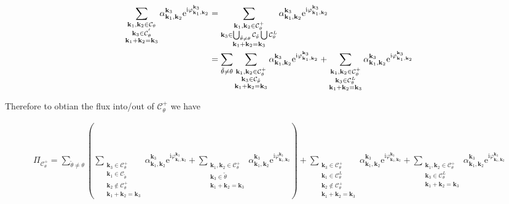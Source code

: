 \documentclass[9pt]{article}
\newcommand{\triad}[3]{\varphi_{#1, #2}^{#3}}                     %
\newcommand{\ii}{\mathrm{i}}      								  %
\newcommand{\e}{\mathrm{e}}      								  %
\newcommand{\alphakkk}[3]{\alpha_{\bfkn{#1}, \bfkn{#2}}^{\bfkn{#3}}}
\newcommand{\bfkn}[1]{\mathbf{k}_{#1}}								%
\begin{document}
\begin{align}
	\sum_{\substack{\bfkn{1}, \bfkn{2} \in \mathcal{C}_{\theta} \\ \bfkn{3} \in \mathcal{C}_{\theta}^{'} \\ \bfkn{1} + \bfkn{2} = \bfkn{3}}} \alphakkk{{1}}{2}{3}\e^{\ii \triad{\bfkn{1}}{\bfkn{2}}{\bfkn{3}}} &= \sum_{\substack{\bfkn{1}, \bfkn{2} \in \mathcal{C}_{\theta}^{+} \\ \bfkn{3} \in \bigcup_{\tilde{\theta} \neq \theta} \mathcal{C}_{\tilde{\theta}} \bigcup \mathcal{C}_{\theta}^{L} \\ \bfkn{1} + \bfkn{2} = \bfkn{3}}} \alphakkk{{1}}{2}{3}\e^{\ii \triad{\bfkn{1}}{\bfkn{2}}{\bfkn{3}}} \notag \\
	&= \sum_{\tilde{\theta} \neq \theta} \sum_{\substack{\bfkn{1}, \bfkn{2} \in \mathcal{C}_{\theta}^{+} \\ \bfkn{3} \in \mathcal{C}_{\tilde{\theta}} \\ \bfkn{1} + \bfkn{2} = \bfkn{3}}} \alphakkk{{1}}{2}{3}\e^{\ii \triad{\bfkn{1}}{\bfkn{2}}{\bfkn{3}}} + \sum_{\substack{\bfkn{1}, \bfkn{2} \in \mathcal{C}_{\theta}^{+} \\ \bfkn{3} \in \mathcal{C}_{\theta}^{L} \\ \bfkn{1} + \bfkn{2} = \bfkn{3}}} \alphakkk{{1}}{2}{3}\e^{\ii \triad{\bfkn{1}}{\bfkn{2}}{\bfkn{3}}}
\end{align}

Therefore to obtian the flux into/out of $\mathcal{C}_{\theta}^{+}$ we have

\begin{align}
	\Pi_{\mathcal{C}_{\theta}^{+}} = \sum_{\tilde{\theta} \neq \theta} \left( \sum_{\substack{\bfkn{3} \in \mathcal{C}_{\theta}^{+} \\ \bfkn{1} \in \mathcal{C}_{\tilde{\theta}} \\ \bfkn{2} \notin \mathcal{C}_{\theta}^{+} \\ \bfkn{1} + \bfkn{2} = \bfkn{3}}} \alphakkk{{1}}{2}{3}\e^{\ii \triad{\bfkn{1}}{\bfkn{2}}{\bfkn{3}}} + \sum_{\substack{\bfkn{1}, \bfkn{2} \in \mathcal{C}_{\theta}^{+} \\ \bfkn{3} \in \mathcal{\tilde{\theta}} \\ \bfkn{1} + \bfkn{2} = \bfkn{3}}} \alphakkk{{1}}{2}{3}\e^{\ii \triad{\bfkn{1}}{\bfkn{2}}{\bfkn{3}}} \right) +  \sum_{\substack{\bfkn{3} \in \mathcal{C}_{\theta}^{+} \\ \bfkn{1} \in \mathcal{C}_{\theta}^{L} \\ \bfkn{2} \notin \mathcal{C}_{\theta}^{+} \\ \bfkn{1} + \bfkn{2} = \bfkn{3}}} \alphakkk{{1}}{2}{3}\e^{\ii \triad{\bfkn{1}}{\bfkn{2}}{\bfkn{3}}} + \sum_{\substack{\bfkn{1}, \bfkn{2} \in \mathcal{C}_{\theta}^{+} \\ \bfkn{3} \in \mathcal{C}_{\theta}^{L} \\ \bfkn{1} + \bfkn{2} = \bfkn{3}}} \alphakkk{{1}}{2}{3}\e^{\ii \triad{\bfkn{1}}{\bfkn{2}}{\bfkn{3}}}
\end{align}
\end{document}
